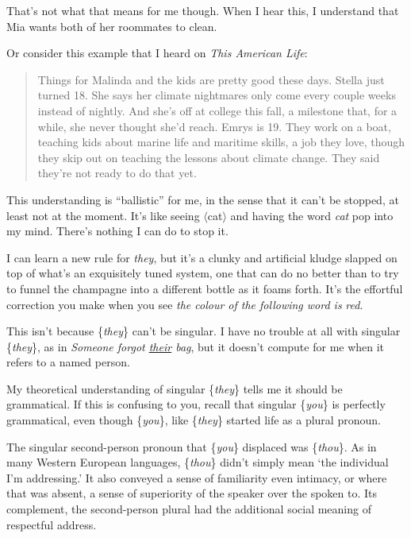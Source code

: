 That's not what that means for me though. When I hear this, I understand that Mia wants both of her roommates to clean.

Or consider this example that I heard on \textit{This American Life}:

\begin{quote}
Things for Malinda and the kids are pretty good these days. Stella just turned 18. She says her climate nightmares only come every couple weeks instead of nightly. And she's off at college this fall, a milestone that, for a while, she never thought she'd reach. Emrys is 19. They work on a boat, teaching kids about marine life and maritime skills, a job they love, though they skip out on teaching the lessons about climate change. They said they're not ready to do that yet. \hfill\citep{thisamericanlife_748}
\end{quote}

This understanding is \enquote{ballistic} for me, in the sense that it can't be stopped, at least not at the moment. It's like seeing $\langle$cat$\rangle$ and having the word \textit{cat} pop into my mind. There's nothing I can do to stop it.

I can learn a new rule for \textit{they}, but it's a clunky and artificial kludge slapped on top of what's an exquisitely tuned system, one that can do no better than to try to funnel the champagne into a different bottle as it foams forth. It's the effortful correction you make when you see \textit{the colour of the following word is} {\color{blue}\textit{red}}.

This isn't because \{\textit{they}\} can't be singular. I have no trouble at all with singular \{\textit{they}\}, as in
\textit{Someone forgot \uline{their} bag}, but it doesn't compute for me when it refers to a named person.

My theoretical understanding of singular \{\textit{they}\} tells me it should be grammatical. If this is confusing to you, recall that singular \{\textit{you}\} is perfectly grammatical, even though \{\textit{you}\}, like \{\textit{they}\} started life as a plural pronoun.

The singular second-person pronoun that \{\textit{you}\} displaced was \{\textit{thou}\}. As in many Western European languages, \{\textit{thou}\} didn't simply mean `the individual I'm addressing.' It also conveyed a sense of familiarity even intimacy, or where that was absent, a sense of superiority of the speaker over the spoken to. Its complement, the second-person plural had the additional social meaning of respectful address.

